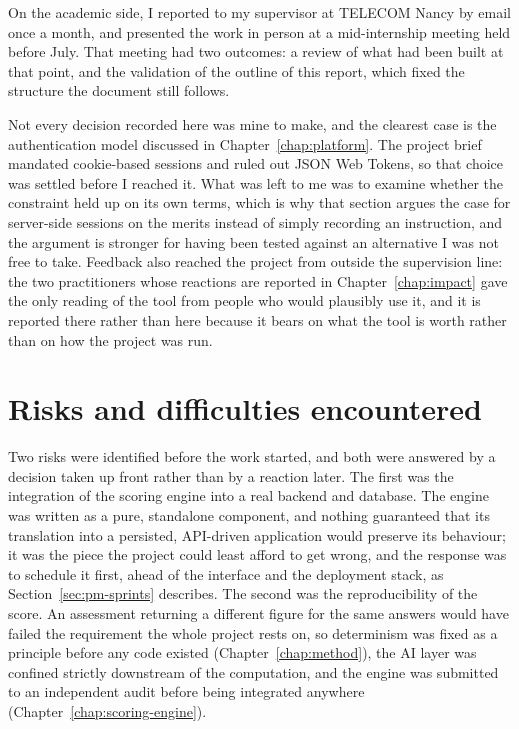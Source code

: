On the academic side, I reported to my supervisor at TELECOM Nancy by email once a month, and presented the work in person at a mid-internship meeting held before July. That meeting had two outcomes: a review of what had been built at that point, and the validation of the outline of this report, which fixed the structure the document still follows.

Not every decision recorded here was mine to make, and the clearest case is the authentication model discussed in Chapter~\ref{chap:platform}. The project brief mandated cookie-based sessions and ruled out JSON Web Tokens, so that choice was settled before I reached it. What was left to me was to examine whether the constraint held up on its own terms, which is why that section argues the case for server-side sessions on the merits instead of simply recording an instruction, and the argument is stronger for having been tested against an alternative I was not free to take. Feedback also reached the project from outside the supervision line: the two practitioners whose reactions are reported in Chapter~\ref{chap:impact} gave the only reading of the tool from people who would plausibly use it, and it is reported there rather than here because it bears on what the tool is worth rather than on how the project was run.


\section{Risks and difficulties encountered}
\label{sec:pm-risks}

Two risks were identified before the work started, and both were answered by a decision taken up front rather than by a reaction later. The first was the integration of the scoring engine into a real backend and database. The engine was written as a pure, standalone component, and nothing guaranteed that its translation into a persisted, API-driven application would preserve its behaviour; it was the piece the project could least afford to get wrong, and the response was to schedule it first, ahead of the interface and the deployment stack, as Section~\ref{sec:pm-sprints} describes. The second was the reproducibility of the score. An assessment returning a different figure for the same answers would have failed the requirement the whole project rests on, so determinism was fixed as a principle before any code existed (Chapter~\ref{chap:method}), the AI layer was confined strictly downstream of the computation, and the engine was submitted to an independent audit before being integrated anywhere (Chapter~\ref{chap:scoring-engine}).

